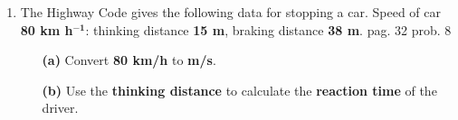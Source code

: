 \documentclass[A4,12pt]{article}
\begin{document}
\begin{enumerate}[label=\bfseries (\arabic*)]
\begin{itemize}
\end{itemize}



















\item The Highway Code gives the following data for stopping a car. Speed of car {\bf 80 km h}$\bm{^{-1}}$: thinking distance {\bf 15 m}, braking distance {\bf 38 m}. \cite{ASCCEA} pag. 32 prob. 8
\begin{itemize}
    \item[\bf (a)] Convert {\bf 80 km/h} to {\bf m/s}.
    \item[\bf (b)] Use the {\bf thinking distance} to calculate the {\bf reaction time} of the driver.
    

\end{itemize}
\end{enumerate}
\end{document}
